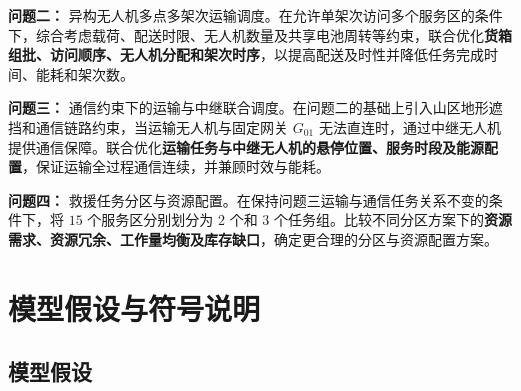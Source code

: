 \documentclass[bwprint,fontset=fandol]{gmcmthesis}
\begin{document}
\textbf{问题二：} 异构无人机多点多架次运输调度。在允许单架次访问多个服务区的条件下，综合考虑载荷、配送时限、无人机数量及共享电池周转等约束，联合优化\textbf{货箱组批、访问顺序、无人机分配和架次时序}，以提高配送及时性并降低任务完成时间、能耗和架次数。

\textbf{问题三：} 通信约束下的运输与中继联合调度。在问题二的基础上引入山区地形遮挡和通信链路约束，当运输无人机与固定网关 $G_{01}$ 无法直连时，通过中继无人机提供通信保障。联合优化\textbf{运输任务与中继无人机的悬停位置、服务时段及能源配置}，保证运输全过程通信连续，并兼顾时效与能耗。

\textbf{问题四：} 救援任务分区与资源配置。在保持问题三运输与通信任务关系不变的条件下，将 $15$ 个服务区分别划分为 $2$ 个和 $3$ 个任务组。比较不同分区方案下的\textbf{资源需求、资源冗余、工作量均衡及库存缺口}，确定更合理的分区与资源配置方案。

\clearpage

\section{模型假设与符号说明}
\subsection{模型假设}
\end{document}
